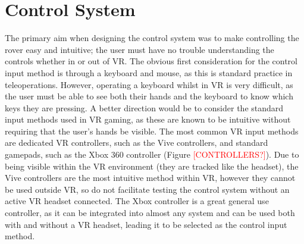 \begin{table}[H]
\centering
\caption{Data Packet Format.}
\label{table:packet}
\end{table}

\section{Control System}

The primary aim when designing the control system was to make controlling the rover easy and intuitive; the user must have no trouble understanding the controls whether in or out of VR. The obvious first consideration for the control input method is through a keyboard and mouse, as this is standard practice in teleoperations. However, operating a keyboard whilst in VR is very difficult, as the user must be able to see both their hands and the keyboard to know which keys they are pressing. A better direction would be to consider the standard input methods used in VR gaming, as these are known to be intuitive without requiring that the user's hands be visible. The most common VR input methods are dedicated VR controllers, such as the Vive controllers, and standard gamepads, such as the Xbox 360 controller (Figure \textcolor{red}{[CONTROLLERS?]}). Due to being visible within the VR environment (they are tracked like the headset), the Vive controllers are the most intuitive method within VR, however they cannot be used outside VR, so do not facilitate testing the control system without an active VR headset connected. The Xbox controller is a great general use controller, as it can be integrated into almost any system and can be used both with and without a VR headset, leading it to be selected as the control input method.

